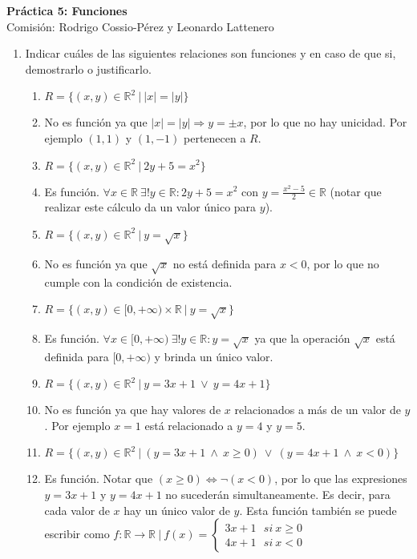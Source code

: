\documentclass[a4paper]{article}
\newcommand{\answer}{\item[**]}
\newcommand{\exercise}{\item}
\newcommand{\Then}{\Rightarrow}
\newcommand{\Eq}{\Leftrightarrow}
\begin{document}
\noindent \hrulefill 
\vspace{-7pt}
\begin{center} 
	\textbf{ Práctica 5: Funciones} \\
	Comisión: Rodrigo Cossio-Pérez y Leonardo Lattenero
\end{center}
\vspace{-10pt}
\hrulefill


\begin{enumerate}

	\exercise Indicar cuáles de las siguientes relaciones son funciones y en caso de que si, demostrarlo o justificarlo.
	\begin{enumerate} [label=(\alph*)]
		\item $R=\{(x,y)\in\mathbb{R}^2 ~|~ |x|=|y|\}$
		\answer No es función ya que $|x|=|y| \Then y=\pm x$, por lo que no hay unicidad. Por ejemplo $(1,1)$ y $(1,-1)$ pertenecen a $R$.

		\item $R=\{(x,y)\in\mathbb{R}^2 ~|~ 2y+5=x^2 \}$
		\answer Es función. $\forall x\in\mathbb{R} ~\exists ! y \in \mathbb{R}: 2y+5=x^2$ con $y=\frac{x^2-5}{2}\in\mathbb{R}$ (notar que realizar este cálculo da un valor único para $y$). 

		\item $R=\{(x,y)\in\mathbb{R}^2 ~|~ y=\sqrt{x} \}$
		\answer No es función ya que $\sqrt{x}$ no está definida para $x<0$, por lo que no cumple con la condición de existencia.

		\item $R=\{(x,y)\in [0,+\infty)\times\mathbb{R} ~|~ y=\sqrt{x} \}$
		\answer Es función. $\forall x\in [0,+\infty) ~\exists ! y \in \mathbb{R}: y=\sqrt{x}$ ya que la operación $\sqrt{x}$ está definida para $[0,+\infty)$ y brinda un único valor.

		\item $R=\{(x,y)\in\mathbb{R}^2 ~|~ y=3x+1 ~\lor~ y=4x+1 \}$
		\answer No es función ya que hay valores de $x$ relacionados a más de un valor de $y$. Por ejemplo $x=1$ está relacionado a $y=4$ y $y=5$.

		\item $R=\{(x,y)\in\mathbb{R}^2 ~|~ (y=3x+1 ~\land~ x\geq0) ~\lor~ (y=4x+1 ~\land~ x<0) \}$
		\answer Es función. Notar que $(x\geq0) \Eq \neg(x<0)$, por lo que las expresiones $y=3x+1$ y $y=4x+1$ no sucederán simultaneamente. Es decir, para cada valor de $x$ hay un único valor de $y$. Esta función también se puede escribir como $f: \mathbb{R} \to \mathbb{R} ~|~ f(x)=\left\{\begin{matrix}3x+1 ~~~si~ x\geq0\\ 4x+1 ~~~si~ x<0\end{matrix}\right.$


\end{enumerate}
\end{enumerate}
\end{document}
